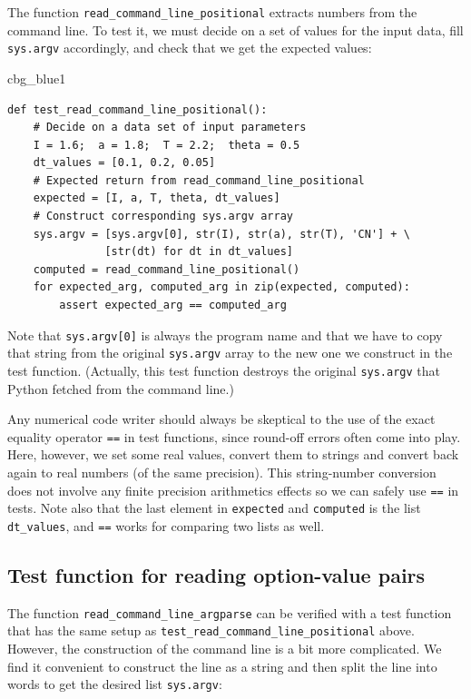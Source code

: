 \documentclass[%
oneside,                 %
final,                   %
10pt]{article}
\newenvironment{_cod_tight}[1]{
   \def\FrameCommand{\colorbox{#1}}
   \FrameRule0.6pt\MakeFramed {\FrameRestore}\vskip3mm}
   {\vskip0mm\endMakeFramed}
\newenvironment{cod}[1]{
\bgroup\rmfamily
\fboxsep=0mm\relax
\begin{_cod_tight}{#1}
\list{}{\parsep=-2mm\parskip=0mm\topsep=0pt\leftmargin=2mm
\rightmargin=2\leftmargin\leftmargin=4pt\relax}
\item\relax}
{\endlist\end{_cod_tight}\egroup}
\begin{document}
The function \Verb!read_command_line_positional! extracts numbers from the
command line. To test it, we must decide on a set of values for
the input data, fill \texttt{sys.argv}
accordingly, and check that we get the expected values:

\begin{cod}{cbg_blue1}\begin{Verbatim}[numbers=none,fontsize=\fontsize{9pt}{9pt},baselinestretch=0.95,xleftmargin=2mm]
def test_read_command_line_positional():
    # Decide on a data set of input parameters
    I = 1.6;  a = 1.8;  T = 2.2;  theta = 0.5
    dt_values = [0.1, 0.2, 0.05]
    # Expected return from read_command_line_positional
    expected = [I, a, T, theta, dt_values]
    # Construct corresponding sys.argv array
    sys.argv = [sys.argv[0], str(I), str(a), str(T), 'CN'] + \ 
               [str(dt) for dt in dt_values]
    computed = read_command_line_positional()
    for expected_arg, computed_arg in zip(expected, computed):
        assert expected_arg == computed_arg
\end{Verbatim}
\end{cod}
\noindent
Note that \texttt{sys.argv[0]} is always the program name and that we have to
copy that string from the original \texttt{sys.argv} array to the new one we
construct in the test function. (Actually, this test function destroys
the original \texttt{sys.argv} that Python fetched from the command line.)

Any numerical code writer should always be skeptical to the use of the exact
equality operator \texttt{==} in test functions, since round-off errors often
come into play. Here, however, we set some real values, convert them
to strings and convert back again to real numbers (of the same precision).
This string-number conversion does not involve any finite precision
arithmetics effects so we
can safely use \texttt{==} in tests. Note also that the last element in
\texttt{expected} and \texttt{computed} is the list \Verb!dt_values!, and \texttt{==} works
for comparing two lists as well.

\subsection{Test function for reading option-value pairs}

The function \Verb!read_command_line_argparse! can be verified with a
test function that has the same setup as \Verb!test_read_command_line_positional!
above.
However, the construction of the command line is a bit more complicated.
We find it convenient to construct the line as a string and then
split the line into words to get the desired list \texttt{sys.argv}:
\end{document}
